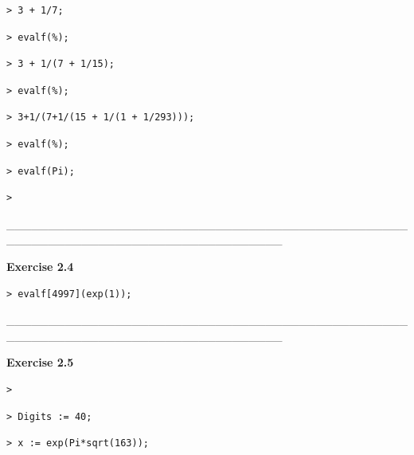 \documentclass{article}
\begin{document}
\begin{lstlisting}
> 3 + 1/7;
\end{lstlisting}
\begin{lstlisting}
> evalf(%);
\end{lstlisting}
\begin{lstlisting}
> 3 + 1/(7 + 1/15);
\end{lstlisting}
\begin{lstlisting}
> evalf(%);
\end{lstlisting}
\begin{lstlisting}
> 3+1/(7+1/(15 + 1/(1 + 1/293)));
\end{lstlisting}
\begin{lstlisting}
> evalf(%);
\end{lstlisting}
\begin{lstlisting}
> evalf(Pi);
\end{lstlisting}
\begin{lstlisting}
> 
\end{lstlisting}
\begin{Maple Normal}
\_\_\_\_\_\_\_\_\_\_\_\_\_\_\_\_\_\_\_\_\_\_\_\_\_\_\_\_\_\_\_\_\_\_\_\_\_\_\_\_\_\_\_\_\_\_\_\_\_\_\_\_\_\_\_\_\_\_\_\_\_\_\_\_\_\_\_\_\_\_\_\_\_\_\_\_\_\_\_\_\_
\end{Maple Normal}
\begin{Maple Heading 2}
\textbf{Exercise 2.4}
\end{Maple Heading 2}
\begin{lstlisting}
> evalf[4997](exp(1));
\end{lstlisting}
\begin{Maple Normal}

\end{Maple Normal}
\begin{Maple Normal}
\_\_\_\_\_\_\_\_\_\_\_\_\_\_\_\_\_\_\_\_\_\_\_\_\_\_\_\_\_\_\_\_\_\_\_\_\_\_\_\_\_\_\_\_\_\_\_\_\_\_\_\_\_\_\_\_\_\_\_\_\_\_\_\_\_\_\_\_\_\_\_\_\_\_\_\_\_\_\_\_\_
\end{Maple Normal}
\begin{Maple Heading 2}
\textbf{Exercise 2.5}
\end{Maple Heading 2}
\begin{lstlisting}
> 
\end{lstlisting}
\begin{lstlisting}
> Digits := 40;
\end{lstlisting}
\begin{lstlisting}
> x := exp(Pi*sqrt(163));
\end{lstlisting}
\end{document}
